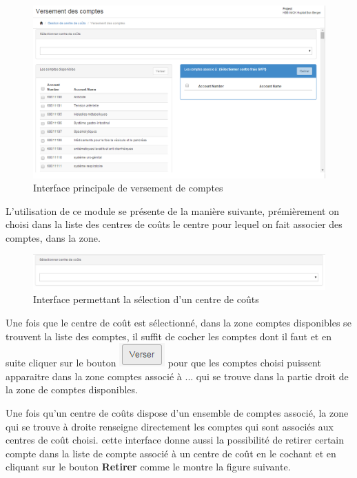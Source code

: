 \documentclass[12pt,a4paper]{report}
\begin{document}
\begin{figure}[h]
\begin{center}
\includegraphics[width=12cm]{pic/VersmtCompte.png}
\end{center}
\caption{Interface principale de versement de comptes}
\label{Interface principale de versement de comptes}
\end{figure} 

L'utilisation de ce module se présente de la manière suivante, prémièrement on choisi dans la liste des centres de coûts le centre pour lequel on fait associer des comptes, dans la zone.

\begin{figure}[h]
\begin{center}
\includegraphics[width=12cm]{pic/SelectCostCenter.png}
\end{center}
\caption{Interface permettant la sélection d'un centre de coûts}
\label{Interface permettant la sélection d'un centre de coûts}
\end{figure} 

Une fois que le centre de coût est sélectionné, dans la zone comptes disponibles se trouvent la liste des comptes, il suffit de cocher les comptes dont il faut et en suite cliquer sur le bouton \includegraphics[scale=0.7]{pic/VerserCompte.png} pour que les comptes choisi puissent apparaitre dans la zone comptes associé à ... qui se trouve dans la partie droit de la zone de comptes disponibles.

Une fois qu'un centre de coûts dispose d'un ensemble de comptes associé, la zone qui se trouve à droite renseigne directement les comptes qui sont associés aux centres de coût choisi. cette interface donne aussi la possibilité de retirer certain compte dans la liste de compte associé à un centre de coût en le cochant et en cliquant sur le bouton \textbf{Retirer} comme le montre la figure suivante.
\end{document}
